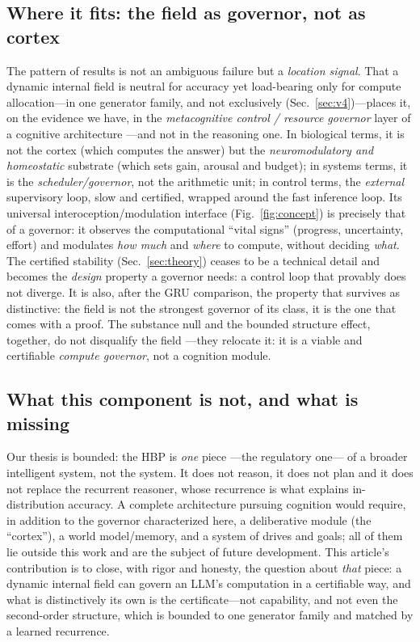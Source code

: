 \documentclass{article}
\begin{document}
\subsection{Where it fits: the field as governor, not as cortex}
The pattern of results is not an ambiguous failure but a \emph{location signal}.
That a dynamic internal field is neutral for accuracy yet load-bearing only
for compute allocation---in one generator family, and not exclusively
(Sec.~\ref{sec:v4})---places it, on the evidence we have, in the \emph{metacognitive control /
resource governor} layer of a cognitive architecture ---and not in the reasoning
one. In biological terms, it is not the cortex (which computes the answer) but
the \emph{neuromodulatory and homeostatic} substrate (which sets gain, arousal
and budget); in systems terms, it is the \emph{scheduler/governor}, not the
arithmetic unit; in control terms, the \emph{external} supervisory loop, slow and
certified, wrapped around the fast inference loop. Its universal
interoception/modulation interface (Fig.~\ref{fig:concept}) is precisely that of
a governor: it observes the computational ``vital signs'' (progress, uncertainty,
effort) and modulates \emph{how much} and \emph{where} to compute, without
deciding \emph{what}. The certified stability (Sec.~\ref{sec:theory}) ceases to
be a technical detail and becomes the \emph{design} property a governor needs: a
control loop that provably does not diverge. It is also, after the GRU
comparison, the property that survives as distinctive: the field is not the
strongest governor of its class, it is the one that comes with a proof. The
substance null and the bounded structure effect, together, do not disqualify the
field ---they relocate it: it is a viable and certifiable \emph{compute
governor}, not a cognition module.

\subsection{What this component is not, and what is missing}
Our thesis is bounded: the HBP is \emph{one} piece ---the regulatory one--- of a
broader intelligent system, not the system. It does not reason, it does not plan
and it does not replace the recurrent reasoner, whose recurrence is what
explains in-distribution accuracy. A complete architecture pursuing cognition would
require, in addition to the governor characterized here, a deliberative module
(the ``cortex''), a world model/memory, and a system of drives and goals; all of
them lie outside this work and are the subject of future development. This
article's contribution is to close, with rigor and honesty, the question about
\emph{that} piece: a dynamic internal field can govern an LLM's computation in a
certifiable way, and what is distinctively its own is the certificate---not
capability, and not even the second-order structure, which is bounded to one
generator family and matched by a learned recurrence.
\end{document}
